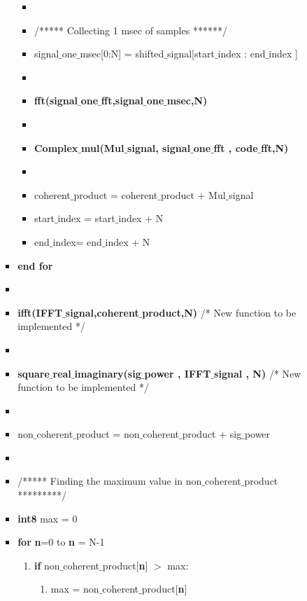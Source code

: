 \documentclass[journal,10pt,onecolumn]{article}
\begin{document}
\begin{itemize}
\begin{enumerate}
\begin{enumerate}
\begin{itemize}
\begin{itemize}
                \item[]
                \item[] /***** Collecting 1 msec of samples ******/
                \item[] signal$\_$one$\_$msec[0:N] = shifted$\_$signal[start$\_$index : end$\_$index ]
                \item[] 
                \item[] \textbf{fft(signal$\_$one$\_$fft,signal$\_$one$\_$msec,N)}
                \item[] 
                \item[] \textbf{Complex$\_$mul(Mul$\_$signal, signal$\_$one$\_$fft , code$\_$fft,N)}
                \item[] 
                \item[] coherent$\_$product = coherent$\_$product +  Mul$\_$signal
                \item[]   start$\_$index =  start$\_$index + N
                \item[]   end$\_$index= end$\_$index + N
            \end{itemize}
            \item[] \textbf{end for}
            \item[] 
            \item[] \textbf{ifft(IFFT$\_$signal,coherent$\_$product,N)} /* New function to be implemented */
            \item[] 
            \item[] \textbf{square$\_$real$\_$imaginary(sig$\_$power , IFFT$\_$signal , N)} /* New function to be implemented */
            \item[] 
            \item[] non$\_$coherent$\_$product = non$\_$coherent$\_$product +  sig$\_$power
            \item[] 
            \item[]  /***** Finding the maximum value in non$\_$coherent$\_$product *********/
            \item[] \textbf{int8} max = 0
            \item[] \textbf{for} \textbf{n}=0 to \textbf{n} = N-1
            \begin{enumerate}
                \item[] \textbf{if} non$\_$coherent$\_$product[\textbf{n}] $>$ max:
                \begin{enumerate}
                    \item[] max = non$\_$coherent$\_$product[\textbf{n}]

\end{enumerate}
\end{enumerate}
\end{itemize}
\end{enumerate}
\end{enumerate}
\end{itemize}
\end{document}
